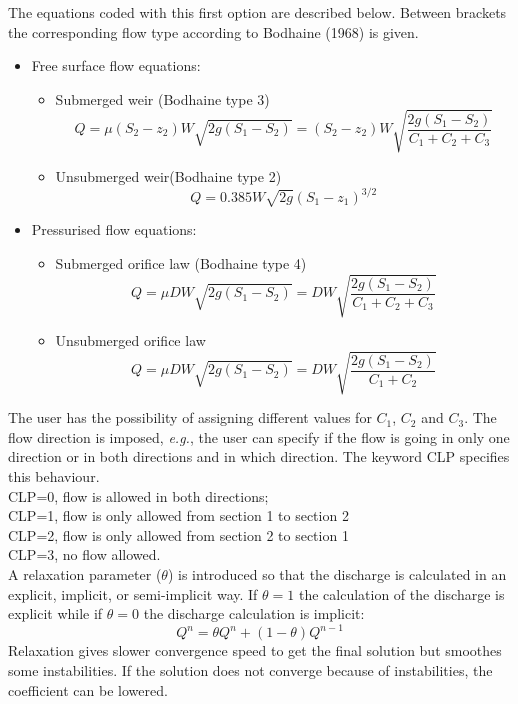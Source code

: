 The equations coded with this first option are described below. 
Between brackets the corresponding flow type according to Bodhaine (1968) is given.
\begin{itemize}
\item Free surface flow equations: 	
  \begin{itemize}
  \item Submerged weir (Bodhaine type 3) 
    \begin{equation}
      Q=\mu (S_2-z_2) W \sqrt{2g(S_1-S_2 )} = (S_2-z_2) W \sqrt{\dfrac{2g(S_1-S_2)}{C_1+C_2+C_3}}
    \end{equation}
  \item Unsubmerged weir(Bodhaine type 2)
    \begin{equation}
      Q=0.385 W \sqrt{2g}(S_1-z_1)^{3/2}
    \end{equation}
  \end{itemize}
\item Pressurised flow equations:
  \begin{itemize}
  \item Submerged orifice law (Bodhaine type 4)
    \begin{equation}
      Q=\mu D W \sqrt{2g(S_1-S_2 )} = D W \sqrt{\dfrac{2g(S_1-S_2)}{C_1+C_2+C_3}}
    \end{equation}
  \item Unsubmerged orifice law 
    \begin{equation}
    Q= \mu D W \sqrt{2g(S_1-S_2)} = D W \sqrt{\dfrac{2g(S_1-S_2)}{C_1+C_2}}
    \end{equation}
  \end{itemize}
\end{itemize}

The user has the possibility of assigning different values for $C_1$, $C_2$ and $C_3$. 
The flow direction is imposed, \textit{e.g.}, the user can specify if the flow is going 
in only one direction or in both directions and in which direction. 
The keyword CLP specifies this behaviour.\\
CLP=0, flow is allowed in both directions;\\
CLP=1, flow is only allowed from section 1 to section 2\\
CLP=2, flow is only allowed from section 2 to section 1\\
CLP=3, no flow allowed.\\
A relaxation parameter ($\theta$) is introduced so that the discharge is calculated 
in an explicit, implicit, or semi-implicit way. 
If $\theta=1$ the calculation of the discharge is explicit while if $\theta=0$ 
the discharge calculation is implicit:
\begin{equation}
  Q^n=\theta Q^n + (1-\theta) Q^{n-1}
\end{equation}
Relaxation gives slower convergence speed to get the final solution 
but smoothes some instabilities. 
If the solution does not converge because of instabilities, the coefficient can be lowered.

